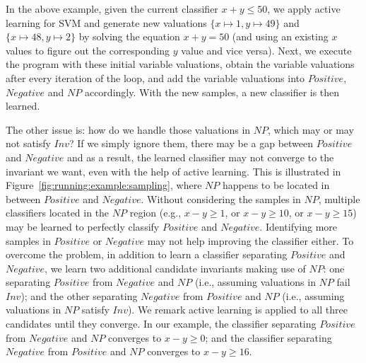 \begin{example}
In the above example, given the current classifier $x+y \leq 50$, we apply active learning for SVM and generate new valuations $\{x \mapsto 1, y \mapsto 49\}$ and $\{x \mapsto 48, y \mapsto 2\}$ by solving the equation $x+y=50$ (and using an existing $x$ values to figure out the corresponding $y$ value and vice versa). Next, we execute the program with these initial variable valuations, obtain the variable valuations after every iteration of the loop, and add the variable valuations into $\mathit{Positive}$, $\mathit{Negative}$ and $\mathit{NP}$ accordingly. With the new samples, a new classifier is then learned.
\end{example}
The other issue is: how do we handle those valuations in $\mathit{NP}$, which may or may not satisfy $\mathit{Inv}$? If we simply ignore them, there may be a gap between $\mathit{Positive}$ and $\mathit{Negative}$ and as a result, the learned classifier may not converge to the invariant we want, even with the help of active learning. This is illustrated in Figure~\ref{fig:running:example:sampling}, where $\mathit{NP}$ happens to be located in between $\mathit{Positive}$ and $\mathit{Negative}$. Without considering the samples in $\mathit{NP}$, multiple classifiers located in the $\mathit{NP}$ region (e.g., $x - y \geq 1$, or $x - y \geq 10$, or $x - y \geq 15$) may be learned to perfectly classify $\mathit{Positive}$ and $\mathit{Negative}$. Identifying more samples in $\mathit{Positive}$ or $\mathit{Negative}$ may not help improving the classifier either. To overcome the problem, in addition to learn a classifier separating $\mathit{Positive}$ and $\mathit{Negative}$, we learn two additional candidate invariants making use of $\mathit{NP}$: one separating $\mathit{Positive}$ from $\mathit{Negative}$ and $\mathit{NP}$ (i.e., assuming valuations in $\mathit{NP}$ fail $\mathit{Inv}$); and the other separating $\mathit{Negative}$ from $\mathit{Positive}$ and $\mathit{NP}$ (i.e., assuming valuations in $\mathit{NP}$ satisfy $\mathit{Inv}$). We remark active learning is applied to all three candidates until they converge. In our example, the classifier separating $\mathit{Positive}$ from $\mathit{Negative}$ and $\mathit{NP}$ converges to $x - y \geq 0$; and the classifier separating $\mathit{Negative}$ from $\mathit{Positive}$ and $\mathit{NP}$ converges to $x - y \geq 16$.

